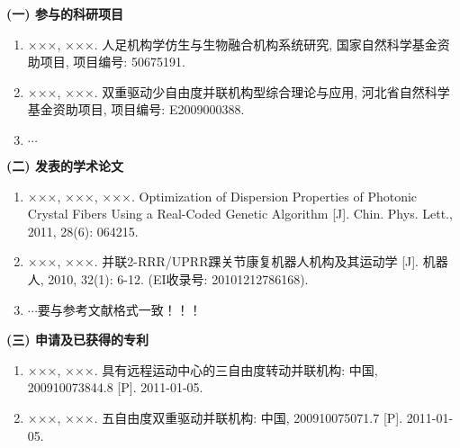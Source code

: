 \makeatletter
{}
  \pagestyle{fancy}%
  \fancyhf{}
\makeatother

\begin{achievement}

{\noindent\textbf{(一) 参与的科研项目}}    %
\begin{enumerate}\setlength{\itemsep}{-0.4em}%
\renewcommand{\labelenumi}{[\theenumi]}
\item ×××, ×××. 人足机构学仿生与生物融合机构系统研究, 国家自然科学基金资助项目, 项目编号: 50675191.
\item ×××, ×××. 双重驱动少自由度并联机构型综合理论与应用, 河北省自然科学基金资助项目, 项目编号: E2009000388.
\item $\cdots$
\end{enumerate}


{\noindent\textbf{(二) 发表的学术论文}}    %
\begin{enumerate}\setlength{\itemsep}{-0.4em}%
\renewcommand{\labelenumi}{[\theenumi]}
\item ×××, ×××, ×××. Optimization of Dispersion Properties of Photonic Crystal Fibers Using a Real-Coded Genetic Algorithm [J]. Chin. Phys. Lett., 2011, 28(6): 064215.
\item ×××, ×××. 并联2-RRR/UPRR踝关节康复机器人机构及其运动学 [J]. 机器人, 2010, 32(1): 6-12. (EI收录号: 20101212786168).
\item $\cdots$要与参考文献格式一致！！！
\end{enumerate}


{\noindent\textbf{(三) 申请及已获得的专利}}    %
\begin{enumerate}\setlength{\itemsep}{-0.4em}%
\renewcommand{\labelenumi}{[\theenumi]}
\item ×××, ×××. 具有远程运动中心的三自由度转动并联机构: 中国, 200910073844.8 [P]. 2011-01-05.
\item ×××, ×××. 五自由度双重驱动并联机构: 中国, 200910075071.7 [P]. 2011-01-05.
\end{enumerate}



\end{achievement}
